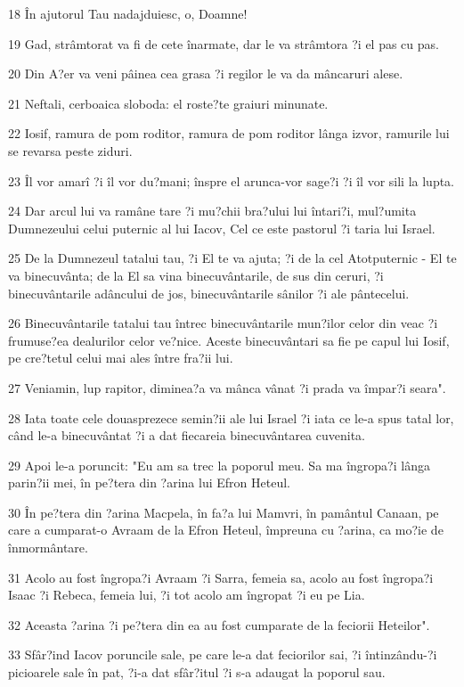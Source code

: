 \par 18 În ajutorul Tau nadajduiesc, o, Doamne!
\par 19 Gad, strâmtorat va fi de cete înarmate, dar le va strâmtora ?i el pas cu pas.
\par 20 Din A?er va veni pâinea cea grasa ?i regilor le va da mâncaruri alese.
\par 21 Neftali, cerboaica sloboda: el roste?te graiuri minunate.
\par 22 Iosif, ramura de pom roditor, ramura de pom roditor lânga izvor, ramurile lui se revarsa peste ziduri.
\par 23 Îl vor amarî ?i îl vor du?mani; înspre el arunca-vor sage?i ?i îl vor sili la lupta.
\par 24 Dar arcul lui va ramâne tare ?i mu?chii bra?ului lui întari?i, mul?umita Dumnezeului celui puternic al lui Iacov, Cel ce este pastorul ?i taria lui Israel.
\par 25 De la Dumnezeul tatalui tau, ?i El te va ajuta; ?i de la cel Atotputernic - El te va binecuvânta; de la El sa vina binecuvântarile, de sus din ceruri, ?i binecuvântarile adâncului de jos, binecuvântarile sânilor ?i ale pântecelui.
\par 26 Binecuvântarile tatalui tau întrec binecuvântarile mun?ilor celor din veac ?i frumuse?ea dealurilor celor ve?nice. Aceste binecuvântari sa fie pe capul lui Iosif, pe cre?tetul celui mai ales între fra?ii lui.
\par 27 Veniamin, lup rapitor, diminea?a va mânca vânat ?i prada va împar?i seara".
\par 28 Iata toate cele douasprezece semin?ii ale lui Israel ?i iata ce le-a spus tatal lor, când le-a binecuvântat ?i a dat fiecareia binecuvântarea cuvenita.
\par 29 Apoi le-a poruncit: "Eu am sa trec la poporul meu. Sa ma îngropa?i lânga parin?ii mei, în pe?tera din ?arina lui Efron Heteul.
\par 30 În pe?tera din ?arina Macpela, în fa?a lui Mamvri, în pamântul Canaan, pe care a cumparat-o Avraam de la Efron Heteul, împreuna cu ?arina, ca mo?ie de înmormântare.
\par 31 Acolo au fost îngropa?i Avraam ?i Sarra, femeia sa, acolo au fost îngropa?i Isaac ?i Rebeca, femeia lui, ?i tot acolo am îngropat ?i eu pe Lia.
\par 32 Aceasta ?arina ?i pe?tera din ea au fost cumparate de la feciorii Heteilor".
\par 33 Sfâr?ind Iacov poruncile sale, pe care le-a dat feciorilor sai, ?i întinzându-?i picioarele sale în pat, ?i-a dat sfâr?itul ?i s-a adaugat la poporul sau.

